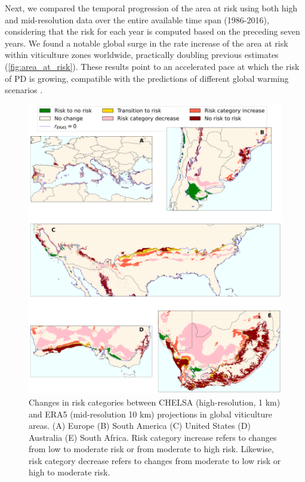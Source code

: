Next, we compared the temporal progression of the area at risk using both
high and mid-resolution data over the entire available time span (1986-2016),
considering that the risk for each year is computed based on the preceding
seven years. We found a notable global surge in the rate increase of the area
at risk within viticulture zones worldwide, practically doubling previous
estimates (\cref{fig:area_at_risk}). These results point to an
accelerated
pace at which the risk of PD is growing, compatible with the predictions of
different global warming scenarios \cite{GimenezRomero2023_PD}.

\begin{figure}[H]
    \centering
    \includegraphics[width=\textwidth]{Figures/ERA5_vs_CHELSA_zones.pdf}
    \caption{Changes in risk categories between CHELSA (high-resolution, 1
        km) and ERA5 (mid-resolution 10 km) projections in global viticulture
        areas.
        (A) Europe (B) South America (C) United States (D) Australia (E) South
        Africa.
        Risk category increase refers to changes from low to moderate risk or
        from
        moderate to high risk. Likewise, risk category decrease refers to
        changes from
        moderate to low risk or high to moderate risk.}
    \label{fig:risk_categories_dif}
\end{figure}

